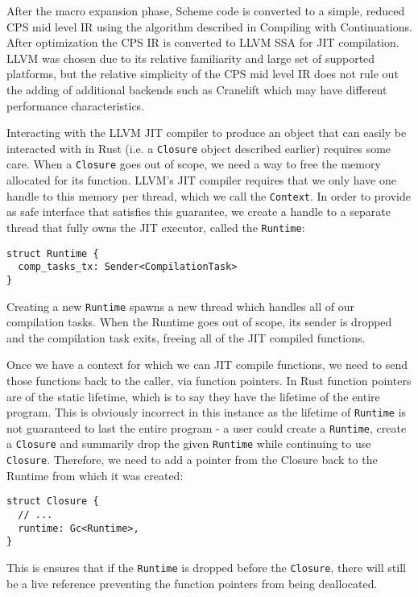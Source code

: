 \documentclass[sigplan,authordraft]{acmart}
\begin{document}
After the macro expansion phase, Scheme code is converted to a simple, reduced
CPS mid level IR using the algorithm described in Compiling with
Continuations\cite{cwc}. After optimization the CPS IR is converted to
LLVM SSA\cite{llvm} for JIT compilation. LLVM was chosen due to its relative
familiarity and large set of supported platforms, but the relative simplicity of
the CPS mid level IR does not rule out the adding of additional backends such
as Cranelift\cite{cranelift} which may have different performance
characteristics.

Interacting with the LLVM JIT compiler to produce an object that can easily be
interacted with in Rust (i.e. a \texttt{Closure} object described earlier)
requires some care. When a \texttt{Closure} goes out of scope, we need a way to
free the memory allocated for its function. LLVM's JIT compiler requires that
we only have one handle to this memory per thread, which we call the
\texttt{Context}\cite{context}. In order to provide as safe interface that
satisfies this guarantee, we create a handle to a separate thread that fully owns
the JIT executor, called the \texttt{Runtime}:

\begin{verbatim}
struct Runtime {
  comp_tasks_tx: Sender<CompilationTask>
}
\end{verbatim}

Creating a new \texttt{Runtime} spawns a new thread which handles all of our
compilation tasks. When the Runtime goes out of scope, its sender is dropped
and the compilation task exits, freeing all of the JIT compiled functions.

Once we have a context for which we can JIT compile functions, we need to send
those functions back to the caller, via function pointers. In Rust function
pointers are of the static lifetime, which is to say they have the lifetime of
the entire program. This is obviously incorrect in this instance as the lifetime
of \texttt{Runtime} is not guaranteed to last the entire program - a user could
create a \texttt{Runtime}, create a \texttt{Closure} and summarily drop the
given \texttt{Runtime} while continuing to use \texttt{Closure}. Therefore,
we need to add a pointer from the Closure back to the Runtime from which it was
created:

\begin{verbatim}
struct Closure {
  // ...
  runtime: Gc<Runtime>,
}
\end{verbatim}

This is ensures that if the \texttt{Runtime} is dropped before the
\texttt{Closure}, there will still be a live reference preventing the function
pointers from being deallocated.
\end{document}
